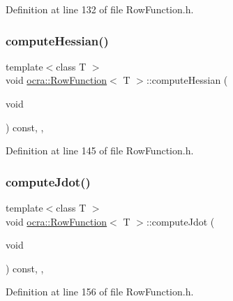 Definition at line 132 of file Row\+Function.\+h.

\hypertarget{classocra_1_1RowFunction_ab9d6a1f29d2a3756700e2200d402b4fb}{}\label{classocra_1_1RowFunction_ab9d6a1f29d2a3756700e2200d402b4fb} 
\subsubsection{\texorpdfstring{compute\+Hessian()}{computeHessian()}}
{\footnotesize\ttfamily template$<$class T $>$ \\
void \hyperlink{classocra_1_1RowFunction}{ocra\+::\+Row\+Function}$<$ T $>$\+::compute\+Hessian (\begin{DoxyParamCaption}\item[{void}]{ }\end{DoxyParamCaption}) const\hspace{0.3cm}{\ttfamily [inline]}, {\ttfamily [protected]}, {\ttfamily [virtual]}}



Definition at line 145 of file Row\+Function.\+h.

\hypertarget{classocra_1_1RowFunction_a1ec66fcc1c35b323c38f3798f2439172}{}\label{classocra_1_1RowFunction_a1ec66fcc1c35b323c38f3798f2439172} 
\subsubsection{\texorpdfstring{compute\+Jdot()}{computeJdot()}}
{\footnotesize\ttfamily template$<$class T $>$ \\
void \hyperlink{classocra_1_1RowFunction}{ocra\+::\+Row\+Function}$<$ T $>$\+::compute\+Jdot (\begin{DoxyParamCaption}\item[{void}]{ }\end{DoxyParamCaption}) const\hspace{0.3cm}{\ttfamily [inline]}, {\ttfamily [protected]}, {\ttfamily [virtual]}}



Definition at line 156 of file Row\+Function.\+h.

\hypertarget{classocra_1_1RowFunction_a6e6009f89040ce403c6b1463dc82b29d}{}\label{classocra_1_1RowFunction_a6e6009f89040ce403c6b1463dc82b29d} 
